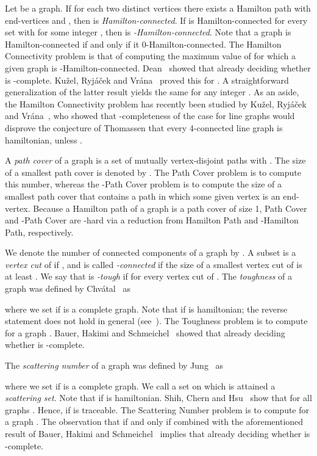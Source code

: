 \documentclass{llncs}
\begin{document}
Let  be a graph.
If for each two distinct vertices  there exists a Hamilton path with end-vertices  and , then
 is {\em Hamilton-connected\/}. If  is Hamilton-connected for every set  with  for some integer , then
 is {\em -Hamilton-connected\/}. Note that a graph is Hamilton-connected if and only if it 0-Hamilton-connected. The  {\sc Hamilton Connectivity} problem is that of computing the
maximum value of  for which a given graph is -Hamilton-connected.  Dean~\cite{De93} showed that already deciding whether  is -complete.
Ku\v{z}el,  Ryj{\'a}\v{c}ek and Vr{\'a}na~\cite{KRV12} proved this for . 
A straightforward generalization of the latter result yields the same for any integer .
As an aside, the {\sc Hamilton Connectivity} problem has recently been studied by Ku\v{z}el, Ryj\'a\v{c}ek and Vr\'ana~\cite{KRV12}, who showed that -completeness of the case 
for line graphs would disprove the conjecture of Thomassen that every 4-connected line graph is hamiltonian, unless . 

A {\it path cover} of a graph  is a set of mutually vertex-disjoint paths
  with  . The size of a smallest path cover is denoted by .
The {\sc Path Cover} problem is to compute this number, whereas the 
{-Path Cover} problem is to compute the size of a smallest path cover that contains a path in which some given vertex  is an end-vertex.
Because a Hamilton path of a graph is a path cover of size 1, 
{\sc Path Cover} and {-Path Cover} are -hard via a reduction from {\sc Hamilton Path} and {-Hamilton Path}, respectively.

We denote the number of connected components of a graph  by . 
A subset  is a
{\em vertex cut\/} of  if , and  is called {\it -connected} if the size of a smallest vertex cut of  is at least .
We say that  is \mbox{{\em{}-tough}} if  for every vertex cut  of  . The {\em toughness\/}  of a graph  was defined by Chv\'atal~\cite{Ch73} as

where we set  if  is a complete graph.
Note that  if  is hamiltonian; the reverse statement does not hold in general (see~\cite{BM08}).
The {\sc Toughness} problem is to compute  for a graph .
Bauer, Hakimi and Schmeichel~\cite{BHS90} showed that already deciding whether  is -complete.

The \emph{scattering number} of a graph  was defined by Jung~\cite{Ju78} as
 
where we set  if  is a complete graph.
We call a set  on which  is attained a \emph{scattering set}.
Note that  if  is hamiltonian.
Shih, Chern and Hsu~\cite{SCH92} show  that
 for all graphs . Hence,  if  is traceable.
The {\sc Scattering Number} problem is to compute  for a graph .
The observation that  if and only if  combined with the aforementioned result of Bauer, Hakimi and Schmeichel~\cite{BHS90}  implies that already deciding whether 
 is -complete.
\end{document}
